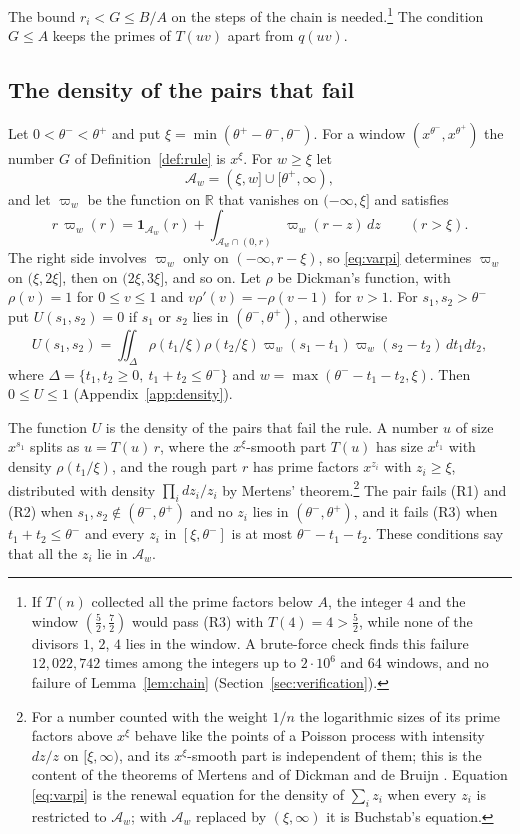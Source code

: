 \documentclass[aps,prd,twocolumn,superscriptaddress,nofootinbib,longbibliography,floatfix,showkeys,nobalancelastpage,amsmath,amssymb,10pt]{revtex4-2}
\theoremstyle{plain}
\theoremstyle{definition}
\theoremstyle{plain}
\newcommand{\one}{\mathbf{1}}
\begin{document}
The bound $r_i<G\le B/A$ on the steps of the chain is needed.\footnote{If $T(n)$ collected all the prime factors below $A$, the integer $4$ and the window $(\frac52,\frac72)$ would pass (R3) with $T(4)=4>\frac52$, while none of the divisors $1$, $2$, $4$ lies in the window. A brute-force check finds this failure $12{,}022{,}742$ times among the integers up to $2\cdot10^6$ and 64 windows, and no failure of Lemma~\ref{lem:chain} (Section~\ref{sec:verification}).} The condition $G\le A$ keeps the primes of $T(uv)$ apart from $q(uv)$.

\subsection{The density of the pairs that fail}

Let $0<\theta^-<\theta^+$ and put $\xi=\min(\theta^+-\theta^-,\theta^-)$. For a window $(x^{\theta^-},x^{\theta^+})$ the number $G$ of Definition~\ref{def:rule} is $x^\xi$. For $w\ge\xi$ let
\[
\mathcal A_w=(\xi,w]\cup[\theta^+,\infty),
\]
and let $\varpi_w$ be the function on $\mathbb R$ that vanishes on $(-\infty,\xi]$ and satisfies
\begin{equation}\label{eq:varpi}
r\,\varpi_w(r)=\one_{\mathcal A_w}(r)+\int_{\mathcal A_w\cap(0,r)}\varpi_w(r-z)\,dz\qquad(r>\xi).
\end{equation}
The right side involves $\varpi_w$ only on $(-\infty,r-\xi)$, so \eqref{eq:varpi} determines $\varpi_w$ on $(\xi,2\xi]$, then on $(2\xi,3\xi]$, and so on. Let $\rho$ be Dickman's function, with $\rho(v)=1$ for $0\le v\le1$ and $v\rho'(v)=-\rho(v-1)$ for $v>1$. For $s_1,s_2>\theta^-$ put $U(s_1,s_2)=0$ if $s_1$ or $s_2$ lies in $(\theta^-,\theta^+)$, and otherwise
\begin{equation}\label{eq:U}
U(s_1,s_2)=\iint_{\Delta}\rho(t_1/\xi)\rho(t_2/\xi)\varpi_w(s_1-t_1)\varpi_w(s_2-t_2)\,dt_1dt_2,
\end{equation}
where $\Delta=\{t_1,t_2\ge0,\ t_1+t_2\le\theta^-\}$ and $w=\max(\theta^--t_1-t_2,\xi)$. Then $0\le U\le1$ (Appendix~\ref{app:density}).

The function $U$ is the density of the pairs that fail the rule. A number $u$ of size $x^{s_1}$ splits as $u=T(u)\,r$, where the $x^\xi$-smooth part $T(u)$ has size $x^{t_1}$ with density $\rho(t_1/\xi)$, and the rough part $r$ has prime factors $x^{z_i}$ with $z_i\ge\xi$, distributed with density $\prod_idz_i/z_i$ by Mertens' theorem.\footnote{For a number counted with the weight $1/n$ the logarithmic sizes of its prime factors above $x^\xi$ behave like the points of a Poisson process with intensity $dz/z$ on $[\xi,\infty)$, and its $x^\xi$-smooth part is independent of them; this is the content of the theorems of Mertens and of Dickman and de Bruijn \cite[Chapter~III.5]{Ten}. Equation \eqref{eq:varpi} is the renewal equation for the density of $\sum_iz_i$ when every $z_i$ is restricted to $\mathcal A_w$; with $\mathcal A_w$ replaced by $(\xi,\infty)$ it is Buchstab's equation.} The pair fails (R1) and (R2) when $s_1,s_2\notin(\theta^-,\theta^+)$ and no $z_i$ lies in $(\theta^-,\theta^+)$, and it fails (R3) when $t_1+t_2\le\theta^-$ and every $z_i$ in $[\xi,\theta^-]$ is at most $\theta^--t_1-t_2$. These conditions say that all the $z_i$ lie in $\mathcal A_w$.
\end{document}
